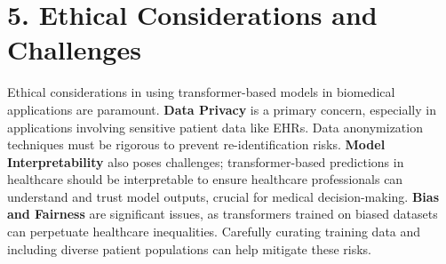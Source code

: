 \documentclass[12pt]{article}
\begin{document}
\section*{5. Ethical Considerations and Challenges}

Ethical considerations in using transformer-based models in biomedical applications are paramount. \textbf{Data Privacy} is a primary concern, especially in applications involving sensitive patient data like EHRs. Data anonymization techniques must be rigorous to prevent re-identification risks. \textbf{Model Interpretability} also poses challenges; transformer-based predictions in healthcare should be interpretable to ensure healthcare professionals can understand and trust model outputs, crucial for medical decision-making. \textbf{Bias and Fairness} are significant issues, as transformers trained on biased datasets can perpetuate healthcare inequalities. Carefully curating training data and including diverse patient populations can help mitigate these risks.
\end{document}
